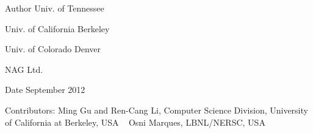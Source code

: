 \begin{DoxyAuthor}{Author}
Univ. of Tennessee 

Univ. of California Berkeley 

Univ. of Colorado Denver 

N\+A\+G Ltd. 
\end{DoxyAuthor}
\begin{DoxyDate}{Date}
September 2012 
\end{DoxyDate}
\begin{DoxyParagraph}{Contributors\+: }
Ming Gu and Ren-\/\+Cang Li, Computer Science Division, University of California at Berkeley, U\+S\+A ~\newline
 Osni Marques, L\+B\+N\+L/\+N\+E\+R\+S\+C, U\+S\+A ~\newline
 
\end{DoxyParagraph}
